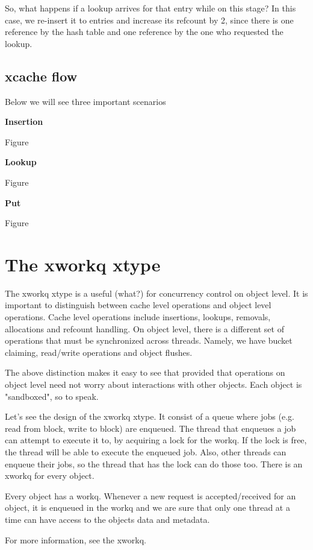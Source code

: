 So, what happens if a lookup arrives for that entry while on this stage? In
this case, we re-insert it to entries and increase its refcount by 2, since
there is one reference by the hash table and one reference by the one who
requested the lookup.

\subsection{xcache flow}

Below we will see three important scenarios

\textbf{Insertion}

Figure

\textbf{Lookup}

Figure

\textbf{Put}

Figure

\section{The xworkq xtype}

The xworkq xtype is a useful (what?) for concurrency control on object level. It 
is important to distinguish between cache level operations and object level 
operations. Cache level operations include insertions, lookups, removals, 
allocations and refcount handling. On object level, there is a different set of 
operations that must be synchronized across threads. Namely, we have bucket 
claiming, read/write operations and object flushes.

The above distinction makes it easy to see that provided that operations on 
object level need not worry about interactions with other objects. Each object 
is "sandboxed", so to speak.

Let's see the design of the xworkq xtype. It consist of a queue where jobs (e.g.  
read from block, write to block) are enqueued. The thread that enqueues a job 
can attempt to execute it to, by acquiring a lock for the workq. If the lock is 
free, the thread will be able to execute the enqueued job. Also, other threads 
can enqueue their jobs, so the thread that has the lock can do those too. There 
is an xworkq for every object.

Every object has a workq. Whenever a new request is accepted/received for an
object, it is enqueued in the workq and we are sure that only one thread at a
time can have access to the objects data and metadata.

For more information, see the xworkq.

